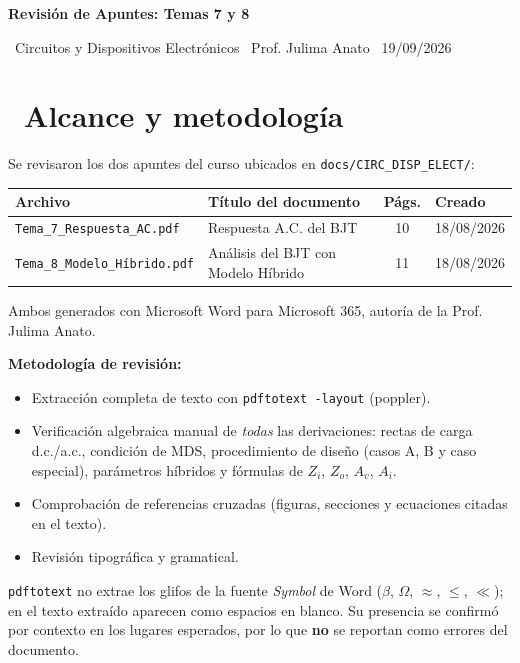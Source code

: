 \documentclass[11pt,a4paper]{article}
\newcommand{\iconoBanda}{microchip}
\newcommand{\bandaTitulo}[3][fondoOscuro]{%
  \begin{tcolorbox}[
    enhanced,
    colback=#1, colframe=#1,
    boxrule=0pt, arc=8pt, outer arc=8pt,
    width=\linewidth,
    top=18pt, bottom=6pt, left=14pt, right=14pt,
    borderline south={3.5pt}{0pt}{cyanNeon},
  ]
    \begin{minipage}[c]{0.07\linewidth}
      \centering
      \textcolor{cyanNeon}{\fontsize{30}{30}\selectfont\faIcon{\iconoBanda}}
    \end{minipage}%
    \hspace{8pt}%
    \begin{minipage}[c]{0.88\linewidth}
      {\fontsize{20}{24}\selectfont\bfseries\color{white}#2}\par\vspace{5pt}%
      \textcolor{cyanNeon!80!white}{\small\faIcon{angle-right}~#3}%
    \end{minipage}
    \vspace{4pt}
  \end{tcolorbox}%
  \vspace{8pt}%
}
\newcommand{\iconotexto}[2]{\textcolor{cyanNeon}{\faIcon{#1}}~#2}
\begin{document}

\bandaTitulo{Revisión de Apuntes: Temas 7 y 8}{Circuitos y Dispositivos Electrónicos \textbullet\ Prof. Julima Anato \textbullet\ 19/09/2026}

\section{\iconotexto{clipboard-check}{Alcance y metodología}}

Se revisaron los dos apuntes del curso ubicados en \texttt{docs/CIRC\_DISP\_ELECT/}:

\begin{tabularx}{\linewidth}{@{} >{\raggedright\arraybackslash}X >{\raggedright\arraybackslash}X c l @{}}
\toprule
\textbf{Archivo} & \textbf{Título del documento} & \textbf{Págs.} & \textbf{Creado} \\
\midrule
\texttt{Tema\_7\_Respuesta\_AC.pdf} & Respuesta A.C. del BJT & 10 & 18/08/2026 \\
\texttt{Tema\_8\_Modelo\_Híbrido.pdf} & Análisis del BJT con Modelo Híbrido & 11 & 18/08/2026 \\
\bottomrule
\end{tabularx}

Ambos generados con Microsoft Word para Microsoft 365, autoría de la Prof. Julima Anato.

\textbf{Metodología de revisión:}
\begin{itemize}[leftmargin=1.4em]
  \item Extracción completa de texto con \texttt{pdftotext -layout} (poppler).
  \item Verificación algebraica manual de \emph{todas} las derivaciones: rectas de carga d.c./a.c., condición de MDS, procedimiento de diseño (casos A, B y caso especial), parámetros híbridos y fórmulas de $Z_i$, $Z_o$, $A_v$, $A_i$.
  \item Comprobación de referencias cruzadas (figuras, secciones y ecuaciones citadas en el texto).
  \item Revisión tipográfica y gramatical.
\end{itemize}

\begin{cajaRecuerda}
\texttt{pdftotext} no extrae los glifos de la fuente \emph{Symbol} de Word ($\beta$, $\Omega$, $\approx$, $\leq$, $\ll$); en el texto extraído aparecen como espacios en blanco. Su presencia se confirmó por contexto en los lugares esperados, por lo que \textbf{no} se reportan como errores del documento.
\end{cajaRecuerda}
\end{document}
